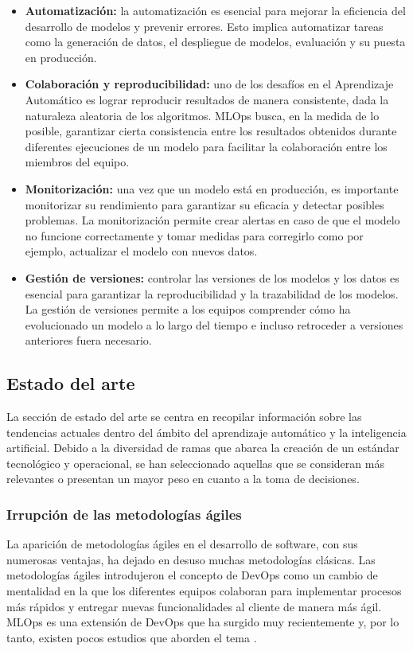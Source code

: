\begin{itemize}
    \item \textbf{Automatización:} la automatización es esencial para mejorar la eficiencia del
    desarrollo de modelos y prevenir errores. Esto implica automatizar tareas como la 
    generación de datos, el despliegue de modelos, evaluación y su puesta en producción.
    \item \textbf{Colaboración y reproducibilidad:} uno de los desafíos en el Aprendizaje Automático es lograr 
    reproducir resultados de manera consistente, dada la naturaleza aleatoria de los algoritmos.
    MLOps busca, en la medida de lo posible, garantizar cierta consistencia entre los resultados
    obtenidos durante diferentes ejecuciones de un modelo para facilitar la colaboración entre
    los miembros del equipo.
    \item \textbf{Monitorización:} una vez que un modelo está en producción, es importante monitorizar
    su rendimiento para garantizar su eficacia y detectar posibles problemas. La monitorización
    permite crear alertas en caso de que el modelo no funcione correctamente y tomar medidas
    para corregirlo como por ejemplo, actualizar el modelo con nuevos datos.
    \item \textbf{Gestión de versiones:} controlar las versiones de los modelos y los datos es esencial
    para garantizar la reproducibilidad y la trazabilidad de los modelos. La gestión de versiones
    permite a los equipos comprender cómo ha evolucionado un modelo a lo largo del tiempo e incluso
    retroceder a versiones anteriores fuera necesario.
\end{itemize}

\subsection{Estado del arte}
La sección de estado del arte se centra en recopilar información sobre las tendencias
actuales dentro del ámbito del aprendizaje automático y la inteligencia artificial.
Debido a la diversidad de ramas que abarca la creación de un estándar tecnológico y
operacional, se han seleccionado aquellas que se consideran más relevantes o presentan
un mayor peso en cuanto a la toma de decisiones.

\subsubsection{Irrupción de las metodologías ágiles}
La aparición de metodologías ágiles en el desarrollo de software, con sus numerosas ventajas, 
ha dejado en desuso muchas metodologías clásicas. Las metodologías ágiles introdujeron el 
concepto de DevOps como un cambio de mentalidad \cite{salvucci2021mlops} 
en la que los diferentes equipos colaboran para implementar procesos más rápidos y 
entregar nuevas funcionalidades al cliente de manera más ágil. MLOps es una extensión de 
DevOps que ha surgido muy recientemente y, por lo tanto, existen pocos estudios que 
aborden el tema \cite{kreuzberger2022mlops}\cite{recupito2022multivocal}.\medskip

